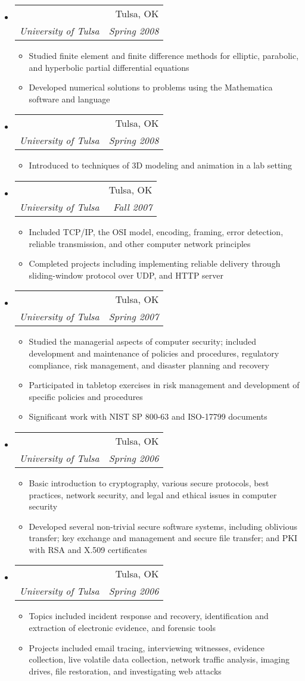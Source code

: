\documentclass[letterpaper,11pt]{article}
\makeatletter
\newcommand{\resitem}[1]{\item #1 \vspace{-2pt}}
\newcommand{\ressubheading}[4]{
\begin{tabular*}{6.5in}{l@{\extracolsep{\fill}}r}
		\textbf{\parbox{5in}{\raggedright #1 }} & #2 \\
		\textit{#3} & \textit{#4} \\
\end{tabular*}\vspace{-6pt}}
\makeatother
\begin{document}
\begin{itemize}
\begin{itemize}
	\end{itemize}
\item
	\ressubheading{Numerical Methods for IVP/BVPs}{Tulsa, OK}{University of Tulsa}{Spring 2008}
	\begin{itemize}
		\resitem{Studied finite element and finite difference methods for elliptic, parabolic, and hyperbolic partial differential equations}
		\resitem{Developed numerical solutions to problems using the Mathematica software and language}
	\end{itemize}
\item
	\ressubheading{Computer Animation}{Tulsa, OK}{University of Tulsa}{Spring 2008}
	\begin{itemize}
		\resitem{Introduced to techniques of 3D modeling and animation in a lab setting}
	\end{itemize}
\item
	\ressubheading{Computer Networks}{Tulsa, OK}{University of Tulsa}{Fall 2007}
	\begin{itemize}
		\resitem{Included TCP/IP, the OSI model, encoding, framing, error detection, reliable transmission, and other computer network principles}
		\resitem{Completed projects including implementing reliable delivery through sliding-window protocol over UDP, and HTTP server}
	\end{itemize}
\item
	\ressubheading{Enterprise Security Management}{Tulsa, OK}{University of Tulsa}{Spring 2007}
	\begin{itemize}
		\resitem{Studied the managerial aspects of computer security; included development and maintenance of policies and procedures, regulatory compliance, risk management, and disaster planning and recovery}
		\resitem{Participated in tabletop exercises in risk management and development of specific policies and procedures}
		\resitem{Significant work with NIST SP 800-63 and ISO-17799 documents}
	\end{itemize}
\item
	\ressubheading{Computer Security}{Tulsa, OK}{University of Tulsa}{Spring 2006}
	\begin{itemize}
		\resitem{Basic introduction to cryptography, various secure protocols, best practices, network security, and legal and ethical issues in computer security}
		\resitem{Developed several non-trivial secure software systems, including oblivious transfer; key exchange and management and secure file transfer; and PKI with RSA and X.509 certificates}
	\end{itemize}
\item
	\ressubheading{Computer Forensics}{Tulsa, OK}{University of Tulsa}{Spring 2006}
	\begin{itemize}
		\resitem{Topics included incident response and recovery, identification and extraction of electronic evidence, and forensic tools}
		\resitem{Projects included email tracing, interviewing witnesses, evidence collection, live volatile data collection, network traffic analysis, imaging drives, file restoration, and investigating web attacks}
	\end{itemize}
\end{itemize}
\end{document}
